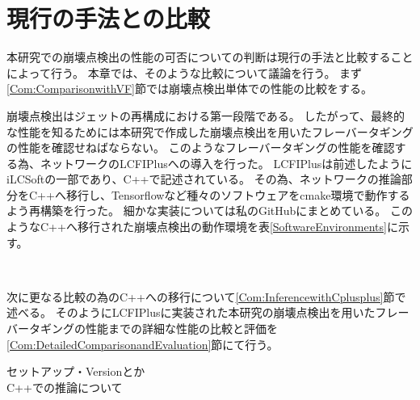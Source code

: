 
\chapter{現行の手法との比較} \label{chap:Comparison}

本研究での崩壊点検出の性能の可否についての判断は現行の手法と比較することによって行う。
本章では、そのような比較について議論を行う。
まず\ref{Com:ComparisonwithVF}節では崩壊点検出単体での性能の比較をする。

崩壊点検出はジェットの再構成における第一段階である。
したがって、最終的な性能を知るためには本研究で作成した崩壊点検出を用いたフレーバータギングの性能を確認せねばならない。
このようなフレーバータギングの性能を確認する為、ネットワークのLCFIPlusへの導入を行った。
LCFIPlusは前述したようにiLCSoftの一部であり、C++で記述されている。
その為、ネットワークの推論部分をC++へ移行し、Tensorflowなど種々のソフトウェアをcmake環境で動作するよう再構築を行った。
細かな実装については私のGitHubにまとめている\cite{GitHubGotoKLCFIPlus}。
このようなC++へ移行された崩壊点検出の動作環境を表\ref{SoftwareEnvironments}に示す。

\begin{table}[htb]
 \centering
　\small
  \caption{崩壊点検出のソフトウェア動作環境}
  \label{SoftwareEnvironments}
\end{table}

次に更なる比較の為のC++への移行について\ref{Com:InferencewithCplusplus}節で述べる。
そのようにLCFIPlusに実装された本研究の崩壊点検出を用いたフレーバータギングの性能までの詳細な性能の比較と評価を\ref{Com:DetailedComparisonandEvaluation}節にて行う。

セットアップ・Versionとか\\
C++での推論について\\

